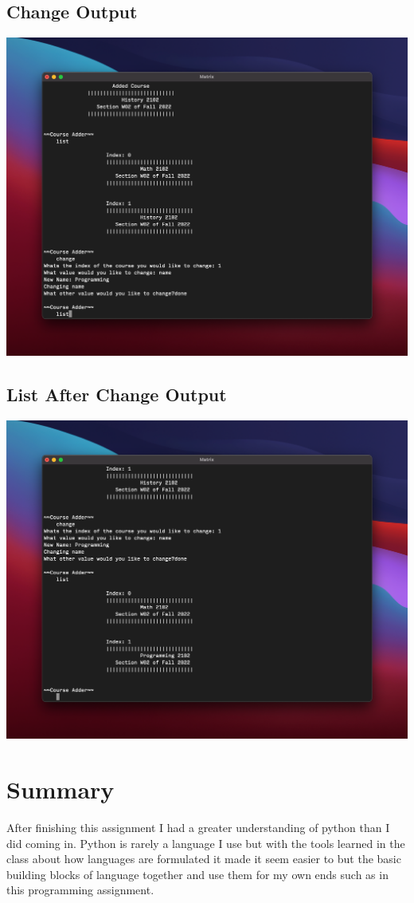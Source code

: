 \documentclass{report}
\begin{document}
\subsection*{Change Output}
\includegraphics[width = \textwidth]{change}
\subsection*{List After Change Output}
\includegraphics[width = \textwidth]{listchange}

\section{Summary}
After finishing this assignment I had a greater understanding of python than I did coming in. 
Python is rarely a language I use but with the tools learned in the class about how languages are formulated it made it seem easier to but the basic building blocks of language together and use them for my own ends such as in this programming assignment. 
\end{document}
